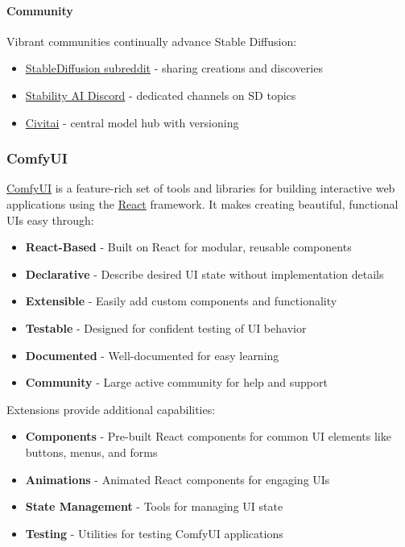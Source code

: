 \paragraph{Community} Vibrant communities continually advance Stable Diffusion:
\begin{itemize}
\item \href{https://www.reddit.com/r/StableDiffusion/}{StableDiffusion subreddit} - sharing creations and discoveries
\item \href{https://discord.gg/stabilityai}{Stability AI Discord} - dedicated channels on SD topics
\item \href{https://civitai.com}{Civitai} - central model hub with versioning
\end{itemize}

\subsubsection{ComfyUI}

\href{https://github.com/comfyanonymous}{ComfyUI} is a feature-rich set of tools and libraries for building interactive web applications using the \href{https://reactjs.org}{React} framework. It makes creating beautiful, functional UIs easy through:

\begin{itemize}
\item \textbf{React-Based} - Built on React for modular, reusable components
\item \textbf{Declarative} - Describe desired UI state without implementation details
\item \textbf{Extensible} - Easily add custom components and functionality
\item \textbf{Testable} - Designed for confident testing of UI behavior
\item \textbf{Documented} - Well-documented for easy learning
\item \textbf{Community} - Large active community for help and support
\end{itemize}

Extensions provide additional capabilities:

\begin{itemize}
\item \textbf{Components} - Pre-built React components for common UI elements like buttons, menus, and forms
\item \textbf{Animations} - Animated React components for engaging UIs
\item \textbf{State Management} - Tools for managing UI state

\item \textbf{Testing} - Utilities for testing ComfyUI applications
\end{itemize}

